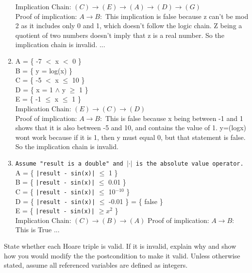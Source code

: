 \documentclass[11pt]{article}
\begin{document}
\begin{enumerate}
Implication Chain: $(C) \rightarrow (E) \rightarrow (A) \rightarrow (D) \rightarrow (G)$ \\
Proof of implication: $A \rightarrow B:$ This implication is false because z can't be mod 2 as it includes only 0 and 1, which doesn't follow the logic chain. Z being a quotient of two numbers doesn't imply that z is a real number. So the implication chain is invalid. 
...

\item A = \{ -7 $<$ x $<$ 0 \} \\
B = \{ y = log(x) \} \\
C = \{ -5 $<$ x $\le$ 10 \} \\
D = \{ x = 1 $\land$ y $\ge$ 1 \} \\
E = \{ -1 $\le$ x $\le$ 1 \} \\

Implication Chain: $(E) \rightarrow (C) \rightarrow (D)$ \\
Proof of implication: $A \rightarrow B:$ This is false because x being between -1 and 1 shows that it is also between -5 and 10, and contains the value of 1. y=(logx) wont work because if it is 1, then y must equal 0, but that statement is false. So the implication chain is invalid.

\item 
\texttt{Assume "result is a double" and $|\cdot|$ is the absolute value operator.}\\
A = \{ \texttt{|result - sin(x)|} $\le$ 1 \} \\
B = \{ \texttt{|result - sin(x)|} $\le$ 0.01 \} \\
C = \{ \texttt{|result - sin(x)|} $\le$ 10$^{-10}$ \} \\
D = \{ \texttt{|result - sin(x)|} $\le$ -0.01 \} = \{ false \} \\
E = \{ \texttt{|result - sin(x)|} $\ge x^2$ \} \\

Implication Chain: $(C) \rightarrow (B) \rightarrow (A)$
\newline
Proof of implication: $A \rightarrow B:$ This is True
...

\end{enumerate}

\newpage

\newline
\noindent State whether each Hoare triple is valid. If it is invalid, explain why and show how you would modify the the postcondition to make it valid. Unless otherwise stated, assume all referenced variables are defined as integers.
\end{document}
